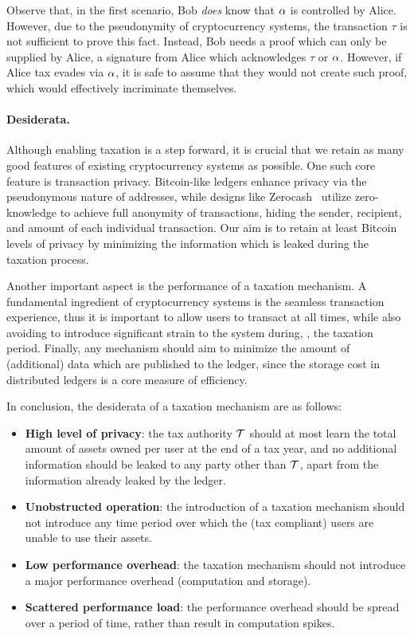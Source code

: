 Observe that, in the first scenario, Bob \emph{does} know that $\alpha$ is
controlled by Alice. However, due to the pseudonymity of cryptocurrency
systems, the transaction $\tau$ is not sufficient to prove this fact. Instead,
Bob needs a proof which can only be supplied by Alice, \eg a signature from
Alice which acknowledges $\tau$ or $\alpha$. However, if Alice tax evades via
$\alpha$, it is safe to assume that they would not create such proof, which
would effectively incriminate themselves.

\paragraph{Desiderata.}\label{subsec:desiderata}

Although enabling taxation is a step forward, it is crucial that we retain as
many good features of existing cryptocurrency systems as possible. One such
core feature is transaction privacy. Bitcoin-like ledgers enhance privacy via
the pseudonymous nature of addresses, while designs like
Zerocash~\cite{SP:BCGGMT14} utilize zero-knowledge to achieve full anonymity of
transactions, \ie hiding the sender, recipient, and amount of each individual
transaction. Our aim is to retain at least Bitcoin levels of privacy by
minimizing the information which is leaked during the taxation process.

Another important aspect is the performance of a taxation mechanism.  A
fundamental ingredient of cryptocurrency systems is the seamless transaction
experience, thus it is important to allow users to transact at all times, while
also avoiding to introduce significant strain to the system during, \eg, the
taxation period. Finally, any mechanism should aim to minimize the amount of
(additional) data which are published to the ledger, since the storage cost in
distributed ledgers is a core measure of efficiency.

In conclusion, the desiderata of a taxation mechanism are as follows:
\begin{itemize}
    \item \textbf{High level of privacy}: the tax authority $\mathcal{T}$ should
        at most learn the total amount of assets owned per user at the end of a
        tax year, and no additional information should be leaked to any party
        other than $\mathcal{T}$, apart from the information already leaked by
        the ledger.
    \item \textbf{Unobstructed operation}: the introduction of a taxation
        mechanism should not introduce any time period over which the (tax
        compliant) users are unable to use their assets.
    \item \textbf{Low performance overhead}: the taxation mechanism should not
        introduce a major performance overhead (\ie computation and storage).
    \item \textbf{Scattered performance load}: the performance overhead should
        be spread over a period of time, rather than result in computation
        spikes.
\end{itemize}
